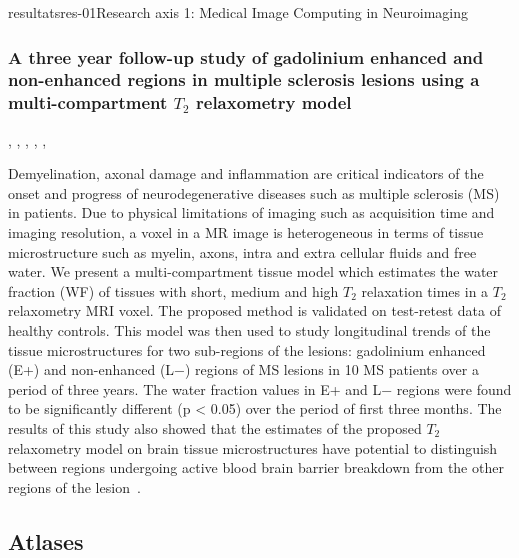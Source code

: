 \documentclass{ra2018}
\begin{document}
\begin{module}{resultats}{res-01}{Research axis 1: Medical Image Computing in Neuroimaging}
\subsubsection{A three year follow-up study of gadolinium enhanced and non-enhanced regions in multiple sclerosis lesions using a multi-compartment $T_2$ relaxometry model}
\begin{participants}
      , 
      ,
      ,
      ,
      ,
\end{participants}
Demyelination, axonal damage and inflammation are critical indicators of the onset and progress of neurodegenerative diseases such as multiple sclerosis (MS) in patients. Due to physical limitations of imaging such as acquisition time and imaging resolution, a voxel in a MR image is heterogeneous in terms of tissue microstructure such as myelin, axons, intra and extra cellular fluids and free water. We present a multi-compartment tissue model which estimates the water fraction (WF) of tissues with short, medium and high $T_2$ relaxation times in a $T_2$ relaxometry MRI voxel. The proposed method is validated on test-retest data of healthy controls. This model was then used to study longitudinal trends of the tissue microstructures for two sub-regions of the lesions: gadolinium enhanced (E+) and non-enhanced (L−) regions of MS lesions in 10 MS patients over a period of three years. The water fraction values in E+ and L− regions were found to be significantly different (p < 0.05) over the period of first three months. The results of this study also showed that the estimates of the proposed $T_2$ relaxometry model on brain tissue microstructures have potential to distinguish between regions undergoing active blood brain barrier breakdown from the other regions of the lesion~\cite{chatterjee:hal-01837974}.

\subsection{Atlases}

\end{module}
\end{document}
